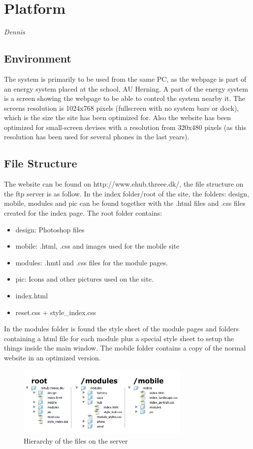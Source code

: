 \newpage
\chapter{Platform} \textit{Dennis}
\section{Environment}
The system is primarily to be used from the same PC, as the webpage is part of an energy system
placed at the school, AU Herning. A part of the energy system is a screen showing the webpage to
be able to control the system nearby it. The screens resolution is 1024x768 pixels (fullscreen with no system bars or dock), 
which is the size the site has been optimized for. Also the website has been optimized for small-screen devises with a resolution from 320x480 pixels (as this resolution has been used for several phones in the last years).
\section{File Structure}
The website can be found on http://www.ehub.threee.dk/, the file structure on the ftp server is as follow. In the index folder/root of the site, the folders: design, mobile, modules and pic can be found together with the .html files and .css files created for the index page. The root folder contains:
\begin{itemize}
	\item design: Photoshop files
	\item mobile: .html, .css and images used for the mobile site
	\item modules: .hmtl and .css files for the module pages.
	\item pic: Icons and other pictures used on the site.	
	\item index.html
	\item reset.css + style\_index.css
\end{itemize}
In the modules folder is found the style sheet of the module pages and folders containing a html file for each module plus a special style sheet to setup the things inside the main window. The mobile folder contains a copy of the normal website in an optimized version.

\begin{figure}[htbp]
	\center
	\includegraphics[width=0.75\textwidth]{images/hierarki.png} %
   	\caption{Hierarchy of the files on the server}
   	\label{fig:file_hierarki}
\end{figure}
\newpage
